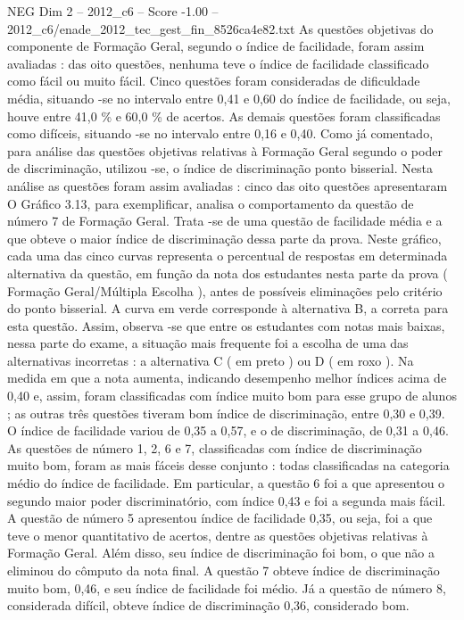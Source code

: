 \begin{textsample}{NEG Dim 2 – 2012\_c6 – Score -1.00 – 2012\_c6/enade\_2012\_tec\_gest\_fin\_8526ca4e82.txt}
As questões objetivas do componente de Formação Geral, segundo o índice de facilidade, foram assim avaliadas : das oito questões, nenhuma teve o índice de facilidade classificado como fácil ou muito fácil.
Cinco questões foram consideradas de dificuldade média, situando -se no intervalo entre 0,41 e 0,60 do índice de facilidade, ou seja, houve entre 41,0 \% e 60,0 \% de acertos.
As demais questões foram classificadas como difíceis, situando -se no intervalo entre 0,16 e 0,40.
Como já comentado, para análise das questões objetivas relativas à Formação Geral segundo o poder de discriminação, utilizou -se, o índice de discriminação ponto bisserial.
Nesta análise as questões foram assim avaliadas : cinco das oito questões apresentaram O Gráfico 3.13, para exemplificar, analisa o comportamento da questão de número 7 de Formação Geral.
Trata -se de uma questão de facilidade média e a que obteve o maior índice de discriminação dessa parte da prova.
Neste gráfico, cada uma das cinco curvas representa o percentual de respostas em determinada alternativa da questão, em função da nota dos estudantes nesta parte da prova ( Formação Geral/Múltipla Escolha ), antes de possíveis eliminações pelo critério do ponto bisserial.
A curva em verde corresponde à alternativa B, a correta para esta questão.
Assim, observa -se que entre os estudantes com notas mais baixas, nessa parte do exame, a situação mais frequente foi a escolha de uma das alternativas incorretas : a alternativa C ( em preto ) ou D ( em roxo ).
Na medida em que a nota aumenta, indicando desempenho melhor índices acima de 0,40 e, assim, foram classificadas com índice muito bom para esse grupo de alunos ; as outras três questões tiveram bom índice de discriminação, entre 0,30 e 0,39.
O índice de facilidade variou de 0,35 a 0,57, e o de discriminação, de 0,31 a 0,46.
As questões de número 1, 2, 6 e 7, classificadas com índice de discriminação muito bom, foram as mais fáceis desse conjunto : todas classificadas na categoria médio do índice de facilidade.
Em particular, a questão 6 foi a que apresentou o segundo maior poder discriminatório, com índice 0,43 e foi a segunda mais fácil.
A questão de número 5 apresentou índice de facilidade 0,35, ou seja, foi a que teve o menor quantitativo de acertos, dentre as questões objetivas relativas à Formação Geral.
Além disso, seu índice de discriminação foi bom, o que não a eliminou do cômputo da nota final.
A questão 7 obteve índice de discriminação muito bom, 0,46, e seu índice de facilidade foi médio.
Já a questão de número 8, considerada difícil, obteve índice de discriminação 0,36, considerado bom.

\end{textsample}
